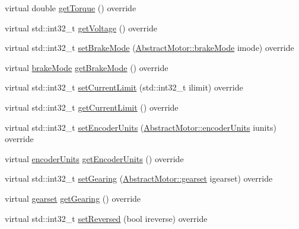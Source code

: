 \begin{DoxyCompactItemize}
\item 
virtual double \mbox{\hyperlink{classokapi_1_1Motor_a4a8c14c49ae44d687772ff41591fdf1d}{get\+Torque}} () override
\item 
virtual std\+::int32\+\_\+t \mbox{\hyperlink{classokapi_1_1Motor_af60eb970996183d86bd4786869f5adb0}{get\+Voltage}} () override
\item 
virtual std\+::int32\+\_\+t \mbox{\hyperlink{classokapi_1_1Motor_a2c40313fa5ff49c25947645885898f91}{set\+Brake\+Mode}} (\mbox{\hyperlink{classokapi_1_1AbstractMotor_a132e0485dbb59a60c3f934338d8fa601}{Abstract\+Motor\+::brake\+Mode}} imode) override
\item 
virtual \mbox{\hyperlink{classokapi_1_1AbstractMotor_a132e0485dbb59a60c3f934338d8fa601}{brake\+Mode}} \mbox{\hyperlink{classokapi_1_1Motor_aec419fead574828b4b1b2642a424dcbe}{get\+Brake\+Mode}} () override
\item 
virtual std\+::int32\+\_\+t \mbox{\hyperlink{classokapi_1_1Motor_ab54e856d8d55c1f53e1be113a9e90a00}{set\+Current\+Limit}} (std\+::int32\+\_\+t ilimit) override
\item 
virtual std\+::int32\+\_\+t \mbox{\hyperlink{classokapi_1_1Motor_ae309fb32ea479cec950dfaa65f3ffebd}{get\+Current\+Limit}} () override
\item 
virtual std\+::int32\+\_\+t \mbox{\hyperlink{classokapi_1_1Motor_a96466636470045aa63d81cb0effc9486}{set\+Encoder\+Units}} (\mbox{\hyperlink{classokapi_1_1AbstractMotor_ae811cd825099f2defadeb1b7f7e7764c}{Abstract\+Motor\+::encoder\+Units}} iunits) override
\item 
virtual \mbox{\hyperlink{classokapi_1_1AbstractMotor_ae811cd825099f2defadeb1b7f7e7764c}{encoder\+Units}} \mbox{\hyperlink{classokapi_1_1Motor_afcc6183588ce056927878dfc479e6fee}{get\+Encoder\+Units}} () override
\item 
virtual std\+::int32\+\_\+t \mbox{\hyperlink{classokapi_1_1Motor_a670cb230fe9686ce8fa71ee20607eb12}{set\+Gearing}} (\mbox{\hyperlink{classokapi_1_1AbstractMotor_a88aaa6ea2fa10f5520a537bbf26774d5}{Abstract\+Motor\+::gearset}} igearset) override
\item 
virtual \mbox{\hyperlink{classokapi_1_1AbstractMotor_a88aaa6ea2fa10f5520a537bbf26774d5}{gearset}} \mbox{\hyperlink{classokapi_1_1Motor_a4dbe4aec1a4c6cb1cad659bada1ab8ed}{get\+Gearing}} () override
\item 
virtual std\+::int32\+\_\+t \mbox{\hyperlink{classokapi_1_1Motor_a558e94850abf85132811a8b281e872df}{set\+Reversed}} (bool ireverse) override
\item 

\end{DoxyCompactItemize}
